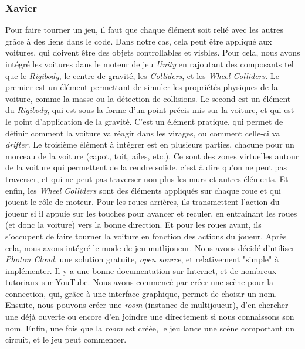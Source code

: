 \documentclass[12pt,a4paper]{article}
\begin{document}
    \subsubsection{Xavier}
        Pour faire tourner un jeu, il faut que chaque élément soit relié avec
        les autres grâce à des liens dans le code. Dans notre cas, cela peut être
        appliqué aux voitures, qui doivent être des objets controllables et visbles.
        Pour cela, nous avons intégré les voitures dans le moteur de jeu \textsl{Unity}
        en rajoutant des composants tel que le \textit{Rigibody}, le centre de gravité,
        les \textit{Colliders}, et les \textit{Wheel Colliders}. Le premier est un élément
        permettant de simuler les propriétés physiques de la voiture, comme la masse ou la
        détection de collisions. Le second est un élément du \textit{Rigibody}, qui est sous
        la forme d'un point précis mis sur la voiture, et qui est le point d'application
        de la gravité. C'est un élément pratique, qui permet de définir comment la
        voiture va réagir dans les virages, ou comment celle-ci va \textit{drifter}.
        Le troisième élément à intégrer est en plusieurs parties, chacune pour un morceau
        de la voiture (capot, toit, ailes, etc.). Ce sont des zones virtuelles autour
        de la voiture qui permettent de la rendre solide, c'est à dire qu'on ne peut pas
        traverser, et qui ne peut pas traverser non plus les murs et autres éléments.
        Et enfin, les \textit{Wheel Colliders} sont des éléments appliqués sur chaque roue
        et qui jouent le rôle de moteur. Pour les roues arrières, ils transmettent l'action
        du joueur si il appuie sur les touches pour avancer et reculer, en entrainant les
        roues (et donc la voiture) vers la bonne direction. Et pour les roues avant,
        ils s'occupent de faire tourner la voiture en fonction des actions du joueur.
        Après cela, nous avons intégré le mode de jeu mutlijoueur. Nous avons décidé
        d'utiliser \textsl{Photon Cloud}, une solution gratuite, \textit{open source},
        et relativement "simple" à implémenter. Il y a une bonne documentation sur
        Internet, et de nombreux tutoriaux sur YouTube. Nous avons commencé par
        créer une scène pour la connection, qui, grâce à une interface graphique,
        permet de choisir un nom. Ensuite, nous pouvons créer une \textit{room}
        (instance de multijoueur), d'en chercher une déjà ouverte ou encore
        d'en joindre une directement si nous connaissons son nom. Enfin, une
        fois que la \textit{room} est créée, le jeu lance une scène comportant
        un circuit, et le jeu peut commencer.
\clearpage
\end{document}
